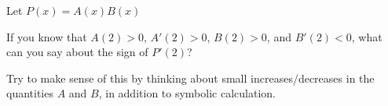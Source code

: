 \documentclass{ximera}
\author{Steven Gubkin}
\begin{document}
\begin{exercise}

Let $P(x) = A(x)B(x)$

If you know that $A(2) > 0$, $A'(2) > 0$, $B(2) > 0$, and $B'(2) < 0$, what can you say about the sign of $P'(2)$?

\begin{multipleChoice}
\end{multipleChoice}

Try to make sense of this by thinking about small increases/decreases in the quantities $A$ and $B$, in addition to symbolic calculation.

\end{exercise}
\end{document}
